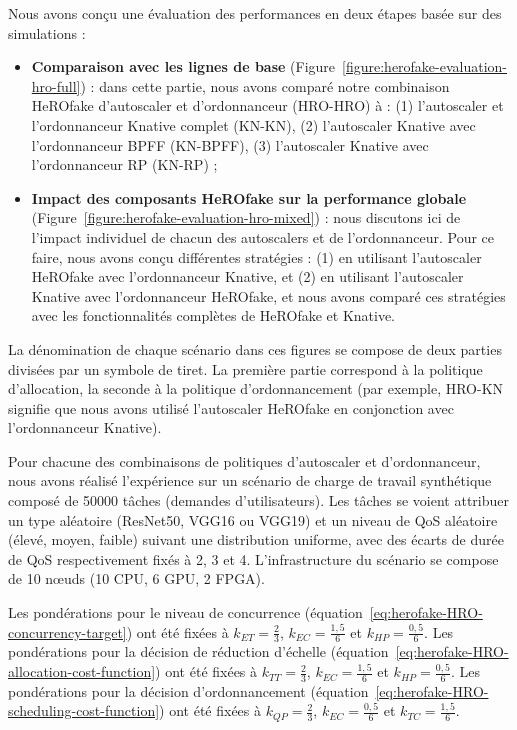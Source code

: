 Nous avons conçu une évaluation des performances en deux étapes basée sur des simulations :

\begin{itemize}
    \item \textbf{Comparaison avec les lignes de base} (Figure~\ref{figure:herofake-evaluation-hro-full}) : dans cette partie, nous avons comparé notre combinaison HeROfake d'autoscaler et d'ordonnanceur (HRO-HRO) à : (1) l'autoscaler et l'ordonnanceur Knative complet (KN-KN), (2) l'autoscaler Knative avec l'ordonnanceur BPFF (KN-BPFF), (3) l'autoscaler Knative avec l'ordonnanceur RP (KN-RP) ; 
    \item \textbf{Impact des composants HeROfake sur la performance globale} (Figure~\ref{figure:herofake-evaluation-hro-mixed}) : nous discutons ici de l'impact individuel de chacun des autoscalers et de l'ordonnanceur. Pour ce faire, nous avons conçu différentes stratégies : (1) en utilisant l'autoscaler HeROfake avec l'ordonnanceur Knative, et (2) en utilisant l'autoscaler Knative avec l'ordonnanceur HeROfake, et nous avons comparé ces stratégies avec les fonctionnalités complètes de HeROfake et Knative.
\end{itemize}

La dénomination de chaque scénario dans ces figures se compose de deux parties divisées par un symbole de tiret. La première partie correspond à la politique d'allocation, la seconde à la politique d'ordonnancement (par exemple, HRO-KN signifie que nous avons utilisé l'autoscaler HeROfake en conjonction avec l'ordonnanceur Knative). 

Pour chacune des combinaisons de politiques d'autoscaler et d'ordonnanceur, nous avons réalisé l'expérience sur un scénario de charge de travail synthétique composé de 50000 tâches (demandes d'utilisateurs). Les tâches se voient attribuer un type aléatoire (ResNet50, VGG16 ou VGG19) et un niveau de QoS aléatoire (élevé, moyen, faible) suivant une distribution uniforme, avec des écarts de durée de QoS respectivement fixés à 2, 3 et 4. L'infrastructure du scénario se compose de 10 nœuds (10 CPU, 6 GPU, 2 FPGA).

Les pondérations pour le niveau de concurrence (équation~\ref{eq:herofake-HRO-concurrency-target}) ont été fixées à $k_{ET} = \frac{2}{3}$, $k_{EC} = \frac{1,5}{6}$ et $k_{HP} = \frac{0,5}{6}$. Les pondérations pour la décision de réduction d'échelle (équation~\ref{eq:herofake-HRO-allocation-cost-function}) ont été fixées à $k_{TT} = \frac{2}{3}$, $k_{EC} = \frac{1,5}{6}$ et $k_{HP} = \frac{0,5}{6}$. Les pondérations pour la décision d'ordonnancement (équation~\ref{eq:herofake-HRO-scheduling-cost-function}) ont été fixées à $k_{QP} = \frac{2}{3}$, $k_{EC} = \frac{0,5}{6}$ et $k_{TC} = \frac{1,5}{6}$. 

